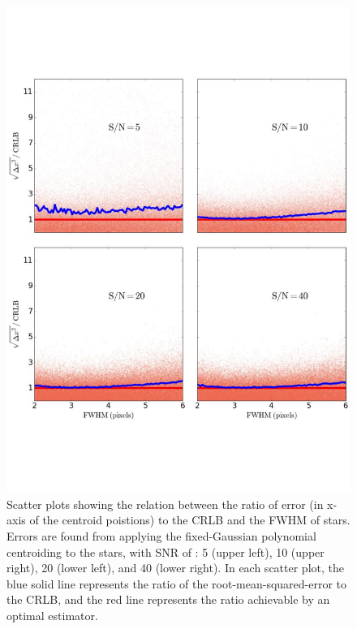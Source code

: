 \begin{figure}[p]~\\
\begin{center}
\includegraphics[width=0.65\linewidth]{figures/centroiding/new_fwhm_polynomial.pdf}
\caption{Scatter plots showing the relation between the ratio of error (in x-axis of the centroid poistions) to the CRLB and the FWHM of stars.
Errors are found from applying the fixed-Gaussian polynomial centroiding to the stars, with SNR  of : 5 (upper left), 10 (upper right), 20 (lower left), and 40 (lower right). In each scatter plot, the blue solid line represents the ratio of the root-mean-squared-error to the CRLB, and the red line represents the ratio achievable by an optimal estimator.}\label{7}
\end{center}
\end{figure}

